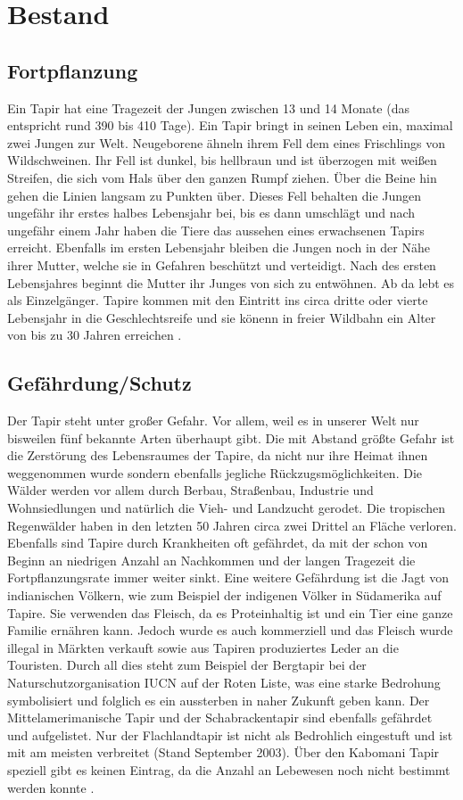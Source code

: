 \documentclass[12pt,a4paper,bibliography=totoc]{scrreprt}
\begin{document}
\chapter{Bestand}

\section{Fortpflanzung}
Ein Tapir hat eine Tragezeit der Jungen zwischen 13 und 14 Monate (das entspricht rund 390 bis 410 Tage). Ein Tapir bringt in seinen Leben ein, maximal zwei Jungen zur Welt. Neugeborene ähneln ihrem Fell dem eines Frischlings von Wildschweinen. Ihr Fell ist dunkel, bis hellbraun und ist überzogen mit weißen Streifen, die sich vom Hals über den ganzen Rumpf ziehen. Über die Beine hin gehen die Linien langsam zu Punkten über. Dieses Fell behalten die Jungen ungefähr ihr erstes halbes Lebensjahr bei, bis es dann umschlägt und nach ungefähr einem Jahr haben die Tiere das aussehen eines erwachsenen Tapirs erreicht. Ebenfalls im ersten Lebensjahr bleiben die Jungen noch in der Nähe ihrer Mutter, welche sie in Gefahren beschützt und verteidigt. Nach des ersten Lebensjahres beginnt die Mutter ihr Junges von sich zu entwöhnen. Ab da lebt es als Einzelgänger. Tapire kommen mit den Eintritt ins circa dritte oder vierte Lebensjahr in die Geschlechtsreife und sie  könenn in freier Wildbahn ein Alter von bis zu 30 Jahren erreichen \cite{3}.


\section{Gefährdung/Schutz}
Der Tapir steht unter großer Gefahr. Vor allem, weil es in unserer Welt nur bisweilen fünf bekannte Arten überhaupt gibt. Die mit Abstand größte Gefahr ist die Zerstörung des Lebensraumes der Tapire, da nicht nur ihre Heimat ihnen weggenommen wurde sondern ebenfalls jegliche Rückzugsmöglichkeiten. Die Wälder werden vor allem durch Berbau, Straßenbau,  Industrie und Wohnsiedlungen und natürlich die Vieh- und Landzucht gerodet. Die tropischen Regenwälder haben in den letzten 50 Jahren circa zwei Drittel an Fläche verloren. Ebenfalls sind Tapire durch Krankheiten oft gefährdet, da mit der schon von Beginn an niedrigen Anzahl an Nachkommen und der langen Tragezeit die Fortpflanzungsrate immer weiter sinkt. Eine weitere Gefährdung ist die Jagt von indianischen Völkern, wie zum Beispiel der indigenen Völker in Südamerika auf Tapire. Sie verwenden das Fleisch, da es Proteinhaltig ist und ein Tier eine ganze Familie ernähren kann. Jedoch wurde es auch kommerziell und das Fleisch wurde illegal in Märkten verkauft sowie aus Tapiren produziertes Leder an die Touristen.  
Durch all dies steht zum Beispiel der Bergtapir bei der Naturschutzorganisation IUCN auf der Roten Liste, was eine starke Bedrohung symbolisiert und folglich es ein aussterben in naher Zukunft geben kann. Der Mittelamerimanische Tapir und der Schabrackentapir sind ebenfalls gefährdet und aufgelistet. Nur der Flachlandtapir ist nicht als Bedrohlich eingestuft und ist mit am meisten verbreitet (Stand September 2003). Über den Kabomani Tapir speziell gibt es keinen Eintrag, da die Anzahl an Lebewesen noch nicht bestimmt werden konnte \cite{4}.
\end{document}
